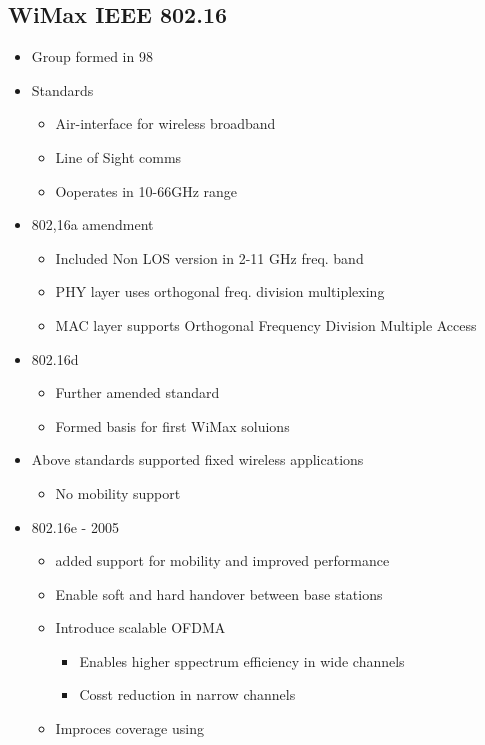 \documentclass[a4paper]{article}
\begin{document}
\subsection{WiMax IEEE 802.16}
\begin{itemize}
	\item Group formed in 98
	\item Standards
	\begin{itemize}
		\item Air-interface for wireless broadband
		\item Line of Sight comms
		\item Ooperates in 10-66GHz range
	\end{itemize}
	\item 802,16a amendment
	\begin{itemize}
		\item Included Non LOS version in 2-11 GHz freq. band
		\item PHY layer uses orthogonal freq. division multiplexing
		\item MAC layer supports Orthogonal Frequency Division Multiple
			Access
	\end{itemize}
	\item 802.16d
	\begin{itemize}
		\item Further amended standard
		\item Formed basis for first WiMax soluions
	\end{itemize}
        \item Above standards supported fixed wireless applications
	\begin{itemize}
		\item No mobility support
	\end{itemize}
	\item 802.16e - 2005
	\begin{itemize}
		\item added support for mobility and improved performance
		\item Enable soft and hard handover between base stations
		\item Introduce scalable OFDMA
		\begin{itemize}
			\item Enables higher sppectrum efficiency in wide
				channels
			\item Cosst reduction in narrow channels
		\end{itemize}
		\item Improces coverage using
		\begin{itemize}

\end{itemize}
\end{itemize}
\end{itemize}
\end{document}
